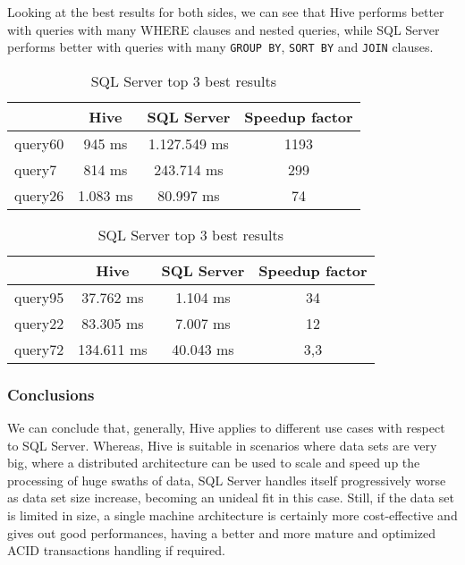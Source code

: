 Looking at the best results for both sides, we can see that Hive performs better with queries with many WHERE clauses and nested queries, while SQL Server performs better with queries with many \texttt{GROUP BY}, \texttt{SORT BY} and \texttt{JOIN} clauses.

\begin{table}[!htb]
    \begin{center}
            \caption{Hive top 3 best results}
        \begin{tabular}{|l|c|c|c|} \hline
            & Hive & SQL Server & Speedup factor\\ \hline
            query60 & 945 ms & 1.127.549 ms & 1193 \\ \hline
            query7 & 814 ms & 243.714 ms & 299 \\ \hline
            query26 & 1.083 ms & 80.997 ms & 74 \\ \hline
        \end{tabular}
    \bigskip
    \caption{SQL Server top 3 best results}
        \begin{tabular}{|l|c|c|c|} \hline
        & Hive & SQL Server & Speedup factor\\ \hline
        query95 & 37.762 ms & 1.104 ms & 34 \\ \hline
        query22 & 83.305 ms & 7.007 ms & 12 \\ \hline
        query72 & 134.611 ms & 40.043 ms & 3,3 \\ \hline
    \end{tabular}
    \end{center}
\end{table}

\subsubsection{Conclusions}

We can conclude that, generally, Hive applies to different use cases with respect to SQL Server. Whereas, Hive is suitable in scenarios where data sets are very big, where a distributed architecture can be used to scale and speed up the processing of huge swaths of data, SQL Server handles itself progressively worse as data set size increase, becoming an unideal fit in this case. Still, if the data set is limited in size, a single machine architecture is certainly more cost-effective and gives out good performances, having a better and more mature and optimized ACID transactions handling if required.

